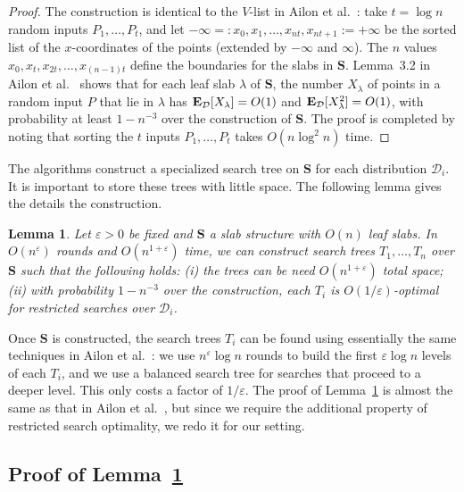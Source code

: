 \documentclass[letterpaper,11pt]{article}
\newtheorem{lemma}[theorem]{Lemma}
\newcommand{\eps}{\varepsilon}
\newcommand{\etal}{et al.}
\newcommand{\EX}{\hbox{\bf E}}
\newcommand{\bS}{\textbf{S}}
\newcommand{\cD}{\mathcal{D}}
\begin{document}
\begin{proof} The construction is identical to
the $V$-list in Ailon \etal~\cite[Lemma~3.2]{AilonCCLMS11}: 
take $t = \log n$ random inputs
$P_1, \dots, P_t$, 
and let
$-\infty =: x_0,x_1,\ldots,x_{nt},x_{nt+1} := +\infty$
be the sorted list of the $x$-coordinates
of the points 
(extended by $-\infty$ and $\infty$).
The $n$ values 
$x_0,x_t,x_{2t},\ldots,x_{(n-1)t}$ 
define the boundaries for the slabs in $\bS$. 
Lemma~3.2 in Ailon \etal~\cite{AilonCCLMS11}
shows that  for each leaf slab $\lambda$
of $\bS$, the number $X_\lambda$ of points
in a random input $P$ that lie in $\lambda$
has $\EX_\cD[X_\lambda] = O(1)$ and 
$\EX_\cD[X_\lambda^2] = O(1)$, with 
probability at least $1-n^{-3}$ over
the construction of $\bS$.
The proof is completed by noting that sorting the
$t$ inputs $P_1, \dots, P_t$ takes 
$O(n \log^2 n)$ time.
\end{proof}

The algorithms construct a  
specialized search tree on $\bS$ for 
each distribution $\cD_i$.
It is important to store these
trees with little space.  
The following lemma gives the details
the construction.

\begin{lemma}\label{lem:tree} 
  Let $\eps > 0$ be fixed and
  $\bS$ a slab structure with $O(n)$ 
  leaf slabs. In $O(n^{\eps})$ rounds 
  and $O(n^{1+\eps})$ time, we can 
  construct search trees $T_1, \dots, T_n$ 
  over $\bS$ such that the following holds:
  \textup(i\textup) the trees can be 
  need $O(n^{1+\eps})$ total space;
  \textup(ii\textup) with probability $1-n^{-3}$ 
  over the construction, 
  each $T_i$ is $O(1/\eps)$-optimal for 
  restricted searches over $\cD_i$.
\end{lemma}

Once $\bS$ is constructed,
the search trees $T_i$ can 
be found using essentially 
the same techniques in 
Ailon \etal~\cite[Section~3.2]{AilonCCLMS11}:
we use $n^\eps\log n$ rounds to 
build the first
$\eps \log n$ levels of each $T_i$, 
and we use a balanced search tree 
for searches that proceed to a deeper 
level. This only costs a factor of $1/\eps$.
The proof of Lemma~\ref{lem:tree} is 
almost the same as that in 
Ailon \etal~\cite[Section~3.2]{AilonCCLMS11},
but since we require the additional
property of restricted search optimality,
we redo it for our setting. 

\subsection{Proof of Lemma~\ref{lem:tree}}
\label{sec:learning}
\end{document}
